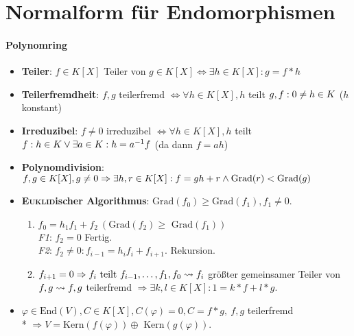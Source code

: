 \section{\label{sec:JNF}Normalform für Endomorphismen}

\paragraph{Polynomring}
\begin{itemize}
	\item \textbf{Teiler}: $f \in K[X]$ Teiler von $g \in K[X] \Leftrightarrow \exists h \in K[X]: g=f*h$
	\item \textbf{Teilerfremdheit}: $f,g$ teilerfremd $\Leftrightarrow \forall h \in K[X], h$ teilt $g, f: \\* 0 \neq h \in K$ ($h$ konstant)
	\item \textbf{Irreduzibel}: $f \neq 0$ irreduzibel $\Leftrightarrow \forall h \in K[X], h$ teilt $f: \\* h \in K \vee \exists a \in K: h = a^{-1}f$ (da dann $f=ah$)
	\item \textbf{Polynomdivision}: $f,g \in K[X], g \neq 0 \Rightarrow \exists h,r \in K[X]: \\* f=gh+r \wedge \text{Grad}(r) < \text{Grad}(g)$
	\item \textbf{\textsc{Euklid}ischer Algorithmus}: $\text{Grad}(f_0) \geq \text{Grad}(f_1), f_1 \neq 0$.
      \begin{enumerate}
        \item $f_0=h_1f_1+f_2\ (\text{Grad}(f_2)\geq\text{ Grad}(f_1))$ \\
          \emph{F1}: $f_2=0$ Fertig. \\
          \emph{F2}: $f_2 \neq 0: f_{i-1} = h_if_i+f_{i+1}$. Rekursion.
        \item $f_{i+1}=0 \Rightarrow f_i \text{ teilt } f_{i-1}, \dots, f_1, f_0 \\* \leadsto f_i$ größter gemeinsamer Teiler von $f,g \\* \leadsto f,g$ teilerfremd $\Rightarrow \exists k,l \in K[X]: 1=k*f+l*g$.
      \end{enumerate}
  	\item $\varphi \in \text{End}(V), C \in K[X], C(\varphi)=0, C=f*g, \ f,g$ teilerfremd \\* $\Rightarrow V=\text{Kern}(f(\varphi))\oplus \text{ Kern}(g(\varphi))$.
\end{itemize}

